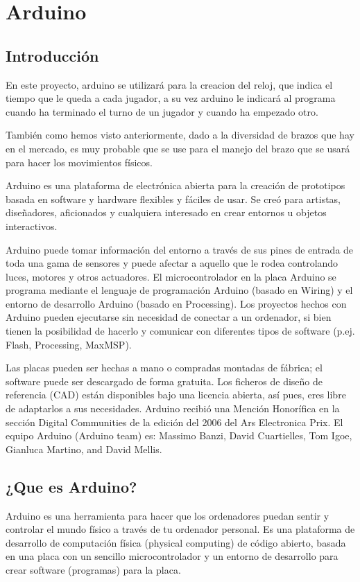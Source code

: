 \documentclass[12pt,a4papert,woside,openright,titlepage,final]{book}
\begin{document}
\section{Arduino}
\subsection{Introducción}
En este proyecto, arduino se utilizará para la creacion del reloj, que indica el
tiempo que le queda a cada jugador, a su vez arduino le indicará al programa
cuando ha terminado el turno de un jugador y cuando ha empezado otro.

También como hemos visto anteriormente, dado a la diversidad de brazos que hay
en el mercado, es muy probable que se use para el manejo del brazo que se usará
para hacer los movimientos físicos.

Arduino es una plataforma de electrónica abierta para la creación de prototipos
basada en software y hardware flexibles y fáciles de usar. Se creó para
artistas, diseñadores, aficionados y cualquiera interesado en crear entornos u
objetos interactivos.

Arduino puede tomar información del entorno a través de sus pines de entrada de
toda una gama de sensores y puede afectar a aquello que le rodea controlando
luces, motores y otros actuadores. El microcontrolador en la placa Arduino se
programa mediante el lenguaje de programación Arduino (basado en Wiring) y el
entorno de desarrollo Arduino (basado en Processing). Los proyectos hechos con
Arduino pueden ejecutarse sin necesidad de conectar a un ordenador, si bien
tienen la posibilidad de hacerlo y comunicar con diferentes tipos de software
(p.ej. Flash, Processing, MaxMSP).

Las placas pueden ser hechas a mano o compradas montadas de fábrica; el software
puede ser descargado de forma gratuita. Los ficheros de diseño de referencia
(CAD) están disponibles bajo una licencia abierta, así pues, eres libre de
adaptarlos a sus necesidades.
Arduino recibió una Mención Honorífica en la sección Digital Communities de la
edición del 2006 del Ars Electronica Prix. El equipo Arduino (Arduino team) es:
Massimo Banzi, David Cuartielles, Tom Igoe, Gianluca Martino, and David Mellis.

\subsection{¿Que es Arduino?}

Arduino es una herramienta para hacer que los ordenadores puedan sentir y
controlar el mundo físico a través de tu ordenador personal. Es una plataforma
de desarrollo de computación física (physical computing) de código abierto,
basada en una placa con un sencillo microcontrolador y un entorno de desarrollo
para crear software (programas) para la placa.
\end{document}
